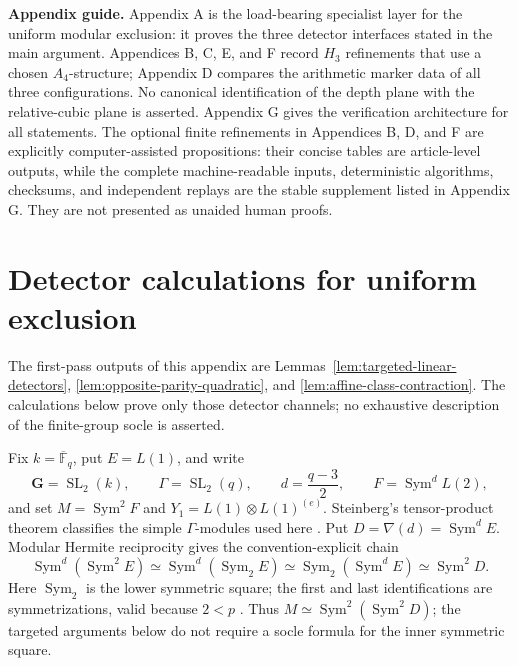\documentclass[11pt]{article}
\theoremstyle{definition}
\theoremstyle{remark}
\newcommand{\F}{\mathbb{F}}
\begin{document}
\clearpage
\appendix

\medskip
\noindent\textbf{Appendix guide.}
Appendix A is the load-bearing specialist layer for the uniform modular
exclusion: it proves the three detector interfaces stated in the main
argument.  Appendices B, C, E, and F record \(H_3\) refinements that use a
chosen \(A_4\)-structure; Appendix D compares the arithmetic marker data of
all three configurations.  No canonical identification of the depth plane
with the relative-cubic plane is asserted.
Appendix G gives the verification architecture for all statements.
The optional finite refinements in Appendices B, D, and F are explicitly
computer-assisted propositions: their concise tables are article-level
outputs, while the complete machine-readable inputs, deterministic
algorithms, checksums, and independent replays are the stable supplement
listed in Appendix G.  They are not presented as unaided human proofs.

\section{Detector calculations for uniform exclusion}
\label{app:modular-detectors}

The first-pass outputs of this appendix are
Lemmas~\ref{lem:targeted-linear-detectors},
\ref{lem:opposite-parity-quadratic}, and
\ref{lem:affine-class-contraction}.  The calculations below prove only
those detector channels; no exhaustive description of the finite-group
socle is asserted.

Fix \(k=\overline{\F}_q\), put \(E=L(1)\), and write
\[
 \mathbf G=\operatorname{SL}_2(k),\qquad
 \Gamma=\operatorname{SL}_2(q),\qquad
 d=\frac{q-3}{2},\qquad F=\operatorname{Sym}^dL(2),
\]
and set \(M=\operatorname{Sym}^2F\) and
\(Y_1=L(1)\otimes L(1)^{(e)}\).
Steinberg's tensor-product theorem classifies the simple
\(\Gamma\)-modules used here
\cite[Theorems~1.1 and~7.4]{Steinberg1963}.  Put
\(D=\nabla(d)=\operatorname{Sym}^dE\).  Modular Hermite reciprocity gives
the convention-explicit chain
\[
 \operatorname{Sym}^d(\operatorname{Sym}^2E)
 \simeq\operatorname{Sym}^d(\operatorname{Sym}_2E)
 \simeq\operatorname{Sym}_2(\operatorname{Sym}^dE)
 \simeq\operatorname{Sym}^2D.                         \tag{A.1a}
\]
Here \(\operatorname{Sym}_2\) is the lower symmetric square; the first and
last identifications are symmetrizations, valid because \(2<p\)
\cite[Corollary~1.5]{McDowellWildon2022}.  Thus
\(M\simeq\operatorname{Sym}^2(\operatorname{Sym}^2D)\); the targeted
arguments below do not require a socle formula for the inner symmetric
square.
\end{document}
